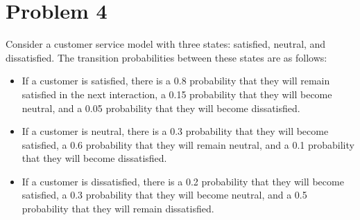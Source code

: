 \documentclass{article}
\begin{document}
\section*{Problem 4} Consider a customer service model with three states: satisfied, neutral, and dissatisfied. The transition probabilities between these states are as follows:\begin{itemize}
    \item If a customer is satisfied, there is a 0.8 probability that they will remain satisfied in the next interaction, a 0.15 probability that they will become neutral, and a 0.05 probability that they will become dissatisfied.
    \item If a customer is neutral, there is a 0.3 probability that they will become satisfied, a 0.6 probability that they will remain neutral, and a 0.1 probability that they will become dissatisfied.
    \item If a customer is dissatisfied, there is a 0.2 probability that they will become satisfied, a 0.3 probability that they will become neutral, and a 0.5 probability that they will remain dissatisfied.
\end{itemize}
\end{document}
